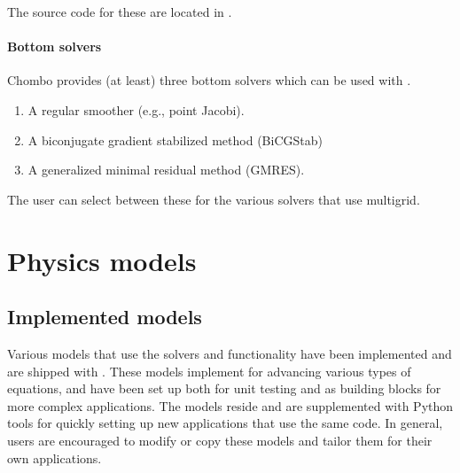 \documentclass[letterpaper,10pt,english]{sphinxmanual}
\begin{document}
The source code for these are located in .


\subsubsection{Bottom solvers}
\label{\detokenize{Source/LinearSolvers:bottom-solvers}}
Chombo provides (at least) three bottom solvers which can be used with .
\begin{enumerate}
%
\item {} 
A regular smoother (e.g., point Jacobi).

\item {} 
A biconjugate gradient stabilized method (BiCGStab)

\item {} 
A generalized minimal residual method (GMRES).

\end{enumerate}

The user can select between these for the various solvers that use multigrid.


\chapter{Physics models}
\label{\detokenize{index:physics-models}}

\section{Implemented models}
\label{\detokenize{Applications/ImplementedModels:implemented-models}}\label{\detokenize{Applications/ImplementedModels:chap-implementedmodels}}\label{\detokenize{Applications/ImplementedModels::doc}}
Various models that use the  solvers and functionality have been implemented and are shipped with .
These models implement  for advancing various types of equations, and have been set up both for unit testing and as building blocks for more complex applications.
The models reside  and are supplemented with Python tools for quickly setting up new applications that use the same code.
In general, users are encouraged to modify or copy these models and tailor them for their own applications.
\end{document}
